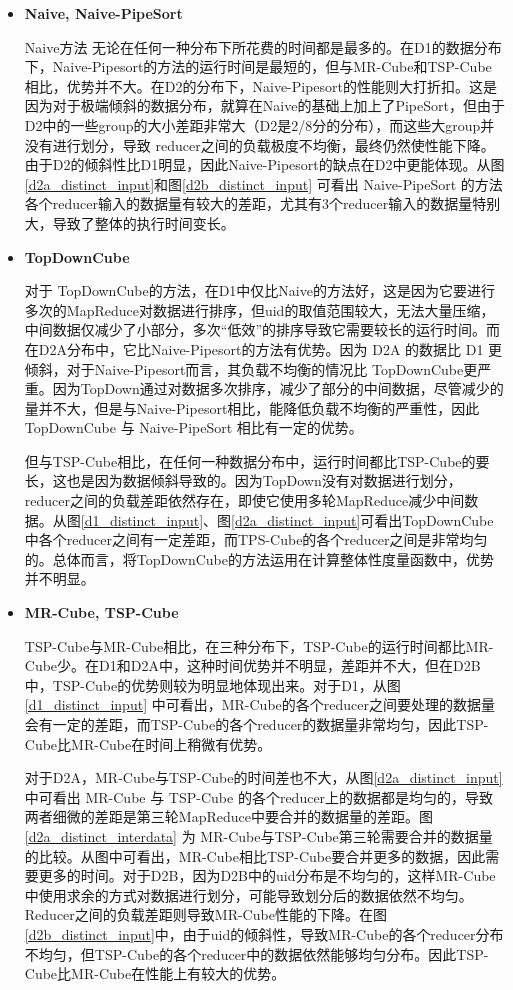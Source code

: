 \begin{itemize}

\item \textbf{Naive, Naive-PipeSort}

Naive方法 无论在任何一种分布下所花费的时间都是最多的。在D1的数据分布下，Naive-Pipesort的方法的运行时间是最短的，但与MR-Cube和TSP-Cube相比，优势并不大。在D2的分布下，Naive-Pipesort的性能则大打折扣。这是因为对于极端倾斜的数据分布，就算在Naive的基础上加上了PipeSort，但由于D2中的一些group的大小差距非常大（D2是2/8分的分布），而这些大group并没有进行划分，导致 reducer之间的负载极度不均衡，最终仍然使性能下降。由于D2的倾斜性比D1明显，因此Naive-Pipesort的缺点在D2中更能体现。从图\ref{d2a_distinct_input}和图\ref{d2b_distinct_input} 可看出 Naive-PipeSort 的方法各个reducer输入的数据量有较大的差距，尤其有3个reducer输入的数据量特别大，导致了整体的执行时间变长。

\item \textbf{TopDownCube}

对于 TopDownCube的方法，在D1中仅比Naive的方法好，这是因为它要进行多次的MapReduce对数据进行排序，但uid的取值范围较大，无法大量压缩，中间数据仅减少了小部分，多次``低效”的排序导致它需要较长的运行时间。而在D2A分布中，它比Naive-Pipesort的方法有优势。因为 D2A 的数据比 D1 更倾斜，对于Naive-Pipesort而言，其负载不均衡的情况比 TopDownCube更严重。因为TopDown通过对数据多次排序，减少了部分的中间数据，尽管减少的量并不大，但是与Naive-Pipesort相比，能降低负载不均衡的严重性，因此TopDownCube 与 Naive-PipeSort 相比有一定的优势。

但与TSP-Cube相比，在任何一种数据分布中，运行时间都比TSP-Cube的要长，这也是因为数据倾斜导致的。因为TopDown没有对数据进行划分，reducer之间的负载差距依然存在，即使它使用多轮MapReduce减少中间数据。从图\ref{d1_distinct_input}、图\ref{d2a_distinct_input}可看出TopDownCube中各个reducer之间有一定差距，而TPS-Cube的各个reducer之间是非常均匀的。总体而言，将TopDownCube的方法运用在计算整体性度量函数中，优势并不明显。

\item \textbf{MR-Cube, TSP-Cube}

TSP-Cube与MR-Cube相比，在三种分布下，TSP-Cube的运行时间都比MR-Cube少。在D1和D2A中，这种时间优势并不明显，差距并不大，但在D2B中，TSP-Cube的优势则较为明显地体现出来。对于D1，从图\ref{d1_distinct_input} 中可看出，MR-Cube的各个reducer之间要处理的数据量会有一定的差距，而TSP-Cube的各个reducer的数据量非常均匀，因此TSP-Cube比MR-Cube在时间上稍微有优势。

对于D2A，MR-Cube与TSP-Cube的时间差也不大，从图\ref{d2a_distinct_input}中可看出 MR-Cube 与 TSP-Cube 的各个reducer上的数据都是均匀的，导致两者细微的差距是第三轮MapReduce中要合并的数据量的差距。图\ref{d2a_distinct_interdata} 为 MR-Cube与TSP-Cube第三轮需要合并的数据量的比较。从图中可看出，MR-Cube相比TSP-Cube要合并更多的数据，因此需要更多的时间。对于D2B，因为D2B中的uid分布是不均匀的，这样MR-Cube中使用求余的方式对数据进行划分，可能导致划分后的数据依然不均匀。Reducer之间的负载差距则导致MR-Cube性能的下降。在图\ref{d2b_distinct_input}中，由于uid的倾斜性，导致MR-Cube的各个reducer分布不均匀，但TSP-Cube的各个reducer中的数据依然能够均匀分布。因此TSP-Cube比MR-Cube在性能上有较大的优势。

\end{itemize}

